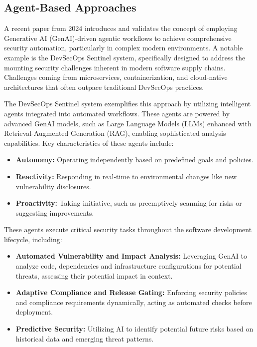 
\subsection{Agent-Based Approaches} %
\label{sec:Agent-Based Approaches}

A recent paper from 2024 introduces and validates the concept of employing Generative AI (GenAI)-driven agentic workflows to achieve comprehensive security automation, particularly in complex modern environments. A notable example is the DevSecOps Sentinel system\cite{pillala_devsecops_2024}, specifically designed to address the mounting security challenges inherent in modern software supply chains. Challenges coming from microservices, containerization, and cloud-native architectures that often outpace traditional DevSecOps practices\cite{pillala_devsecops_2024}.

The DevSecOps Sentinel system exemplifies this approach by utilizing intelligent agents integrated into automated workflows. These agents are powered by advanced GenAI models, such as Large Language Models (LLMs) enhanced with Retrieval-Augmented Generation (RAG), enabling sophisticated analysis capabilities\cite{pillala_devsecops_2024}. Key characteristics of these agents include:

\begin{itemize}
    \item \textbf{Autonomy:} Operating independently based on predefined goals and policies.
    \item \textbf{Reactivity:} Responding in real-time to environmental changes like new vulnerability disclosures.
    \item \textbf{Proactivity:} Taking initiative, such as preemptively scanning for risks or suggesting improvements\cite{pillala_devsecops_2024}.
\end{itemize}

These agents execute critical security tasks throughout the software development lifecycle, including:

\begin{itemize}
    \item \textbf{Automated Vulnerability and Impact Analysis:} Leveraging GenAI to analyze code, dependencies and infrastructure configurations for potential threats, assessing their potential impact in context\cite{pillala_devsecops_2024}.
    \item \textbf{Adaptive Compliance and Release Gating:} Enforcing security policies and compliance requirements dynamically, acting as automated checks before deployment\cite{pillala_devsecops_2024}.
    \item \textbf{Predictive Security:} Utilizing AI to identify potential future risks based on historical data and emerging threat patterns\cite{pillala_devsecops_2024}.
\end{itemize}

